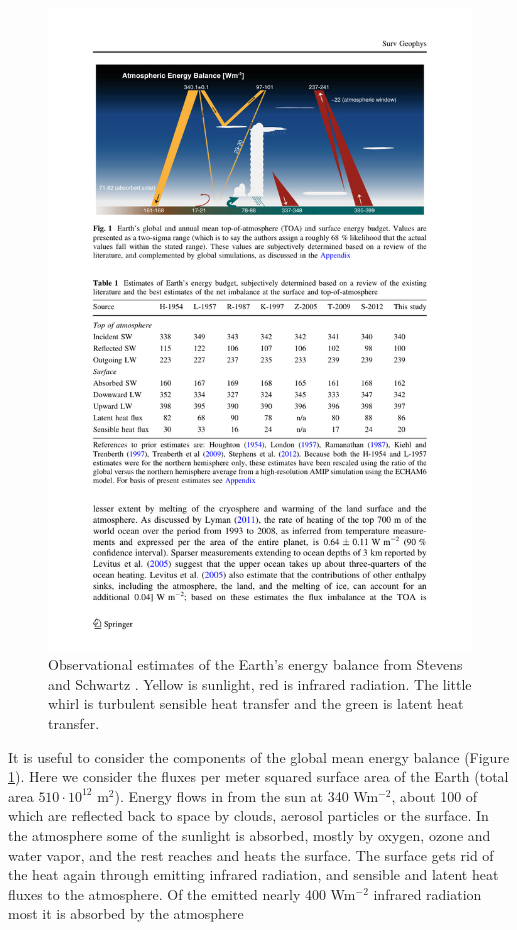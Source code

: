 \documentclass[12pt]{book}
\begin{document}
\begin{figure}
\begin{center}
\includegraphics[width=15 cm]{../external_figures/Stevens_Schwartz_2012_energy_flows.pdf}
\end{center}
\caption{ Observational estimates of the Earth's energy balance from Stevens and Schwartz \citep{Stevens2012}. Yellow is sunlight, red is infrared radiation. The little whirl is turbulent sensible heat transfer and the green is latent heat transfer. } 
\label{fig:energy_flows}
\end{figure}

It is useful to consider the components of the global mean energy balance (Figure \ref{fig:energy_flows}). Here we consider the fluxes per meter squared surface area of the Earth (total area $510\cdot 10^{12}$ m$^2$). Energy flows in from the sun at 340 Wm$^{-2}$, about 100 of which are reflected back to space by clouds, aerosol particles or the surface. In the atmosphere some of the sunlight is absorbed, mostly by oxygen, ozone and water vapor, and the rest reaches and heats the surface. The surface gets rid of the heat again through emitting infrared radiation, and sensible and latent heat fluxes to the atmosphere. Of the emitted nearly 400 Wm$^{-2}$ infrared radiation most it is absorbed by the atmosphere
\end{document}
